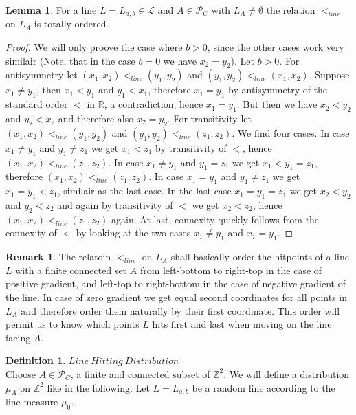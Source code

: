 \documentclass[12pt,a4paper]{scrartcl}
\numberwithin{equation}{section}
\numberwithin{equation}{section}%
\theoremstyle{definition}
\newtheorem{lemma}[theorem]{Lemma}
\newtheorem{definition}[theorem]{Definition}
\theoremstyle{definition}
\newtheorem{rem}[thm]{Remark}%
\begin{document}
\begin{lemma}
For a line $L=L_{a,b}\in \mathcal{L}$ and $A\in \mathcal{P}_C$ with $L_A\neq \emptyset$ the relation $<_{line}$ on $L_A$ is totally ordered. 
	\begin{proof}
		We will only proove the case where $b>0$, since the other cases work very similair (Note, that in the case $b=0$ we have $x_2 = y_2$). Let $b>0$. For antisymmetry let $(x_1, x_2) <_{line} (y_1, y_2)$ and $(y_1, y_2) <_{line} (x_1, x_2)$. Suppose $x_1\neq y_1$, then $x_1 < y_1$ and $y_1 < x_1$, therefore $x_1 = y_1$ by antisymmetry of the standard order $<$ in $\mathbb{R}$, a contradiction, hence $x_1 = y_1$. But then we have $x_2 < y_2$ and $y_2 < x_2$ and therefore also $x_2 = y_2$. For transitivity let $(x_1,x_2) <_{line} (y_1,y_2)$ and $(y_1,y_2) <_{line} (z_1,z_2)$. We find four cases. In case $x_1 \neq y_1$ and $y_1 \neq z_1$ we get $x_1 < z_1$ by transitivity of $<$, hence $(x_1,x_2) <_{line} (z_1,z_2)$. In case $x_1\neq y_1$ and $y_1 = z_1$ we get $x_1 < y_1 = z_1$, therefore $(x_1,x_2) <_{line} (z_1,z_2)$. In case $x_1 = y_1$ and $y_1 \neq z_1$ we get $x_1 = y_1 < z_1$, similair as the last case. In the last case $x_1 = y_1 = z_1$ we get $x_2 < y_2$ and $y_2 < z_2$ and again by transitivity of $<$ we get $x_2 < z_2$, hence $(x_1,x_2) <_{line} (z_1,z_2)$ again. At last, connexity quickly follows from the connexity of $<$ by looking at the two cases $x_1 \neq y_1$ and $x_1 = y_1$. 
	\end{proof}
\end{lemma}

\begin{rem}
	The relatoin $<_{line}$ on $L_A$ shall basically order the hitpoints of a line $L$ with a finite connected set $A$ from left-bottom to right-top in the case of positive gradient, and left-top to right-bottom in the case of negative gradient of the line. In case of zero gradient we get equal second coordinates for all points in $L_A$ and therefore order them naturally by their first coordinate. This order will permit us to know which points $L$ hits first and last when moving on the line facing $A$.  
\end{rem}


\begin{definition} $\mathit{Line\ Hitting\ Distribution}$\\
	Choose $A\in \mathcal{P}_C$, a finite and connected subset of $\mathbb{Z}^2$. We will define a distribution $\mu_A$ on $\mathbb{Z}^2$ like in the following. 
	Let $L=L_{a,b}$ be a random line according to the line measure $\mu_0$. 
\end{definition}
\end{document}
